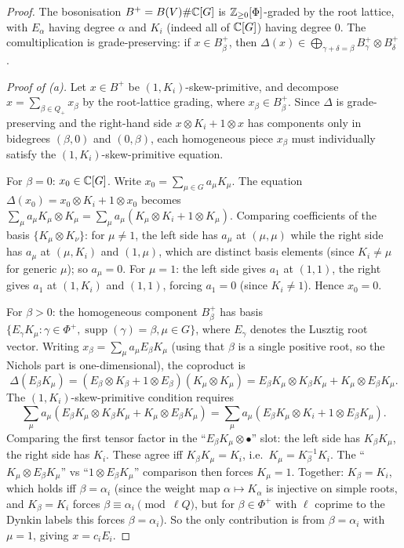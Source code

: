\begin{proof}
The bosonisation $B^+ = B(V) \# \mathbb{C}[G]$ is $\mathbb{Z}_{\geq 0}[\Phi]$-graded by the root lattice, with $E_\alpha$ having degree $\alpha$ and $K_i$ (indeed all of $\mathbb{C}[G]$) having degree $0$. The comultiplication is grade-preserving: if $x \in B^+_\beta$, then $\Delta(x) \in \bigoplus_{\gamma + \delta = \beta} B^+_\gamma \otimes B^+_\delta$.

\emph{Proof of (a).} Let $x \in B^+$ be $(1, K_i)$-skew-primitive, and decompose $x = \sum_{\beta \in Q_+} x_\beta$ by the root-lattice grading, where $x_\beta \in B^+_\beta$. Since $\Delta$ is grade-preserving and the right-hand side $x \otimes K_i + 1 \otimes x$ has components only in bidegrees $(\beta, 0)$ and $(0, \beta)$, each homogeneous piece $x_\beta$ must individually satisfy the $(1, K_i)$-skew-primitive equation.

For \emph{$\beta = 0$}: $x_0 \in \mathbb{C}[G]$. Write $x_0 = \sum_{\mu \in G} a_\mu K_\mu$. The equation $\Delta(x_0) = x_0 \otimes K_i + 1 \otimes x_0$ becomes $\sum_\mu a_\mu K_\mu \otimes K_\mu = \sum_\mu a_\mu (K_\mu \otimes K_i + 1 \otimes K_\mu)$. Comparing coefficients of the basis $\{K_\mu \otimes K_\nu\}$: for $\mu \neq 1$, the left side has $a_\mu$ at $(\mu, \mu)$ while the right side has $a_\mu$ at $(\mu, K_i)$ and $(1, \mu)$, which are distinct basis elements (since $K_i \neq \mu$ for generic $\mu$); so $a_\mu = 0$. For $\mu = 1$: the left side gives $a_1$ at $(1,1)$, the right gives $a_1$ at $(1, K_i)$ and $(1, 1)$, forcing $a_1 = 0$ (since $K_i \neq 1$). Hence $x_0 = 0$.

For \emph{$\beta > 0$}: the homogeneous component $B^+_\beta$ has basis $\{E_\gamma K_\mu : \gamma \in \Phi^+, \operatorname{supp}(\gamma) = \beta, \mu \in G\}$, where $E_\gamma$ denotes the Lusztig root vector. Writing $x_\beta = \sum_\mu a_\mu E_\beta K_\mu$ (using that $\beta$ is a single positive root, so the Nichols part is one-dimensional), the coproduct is
\[
\Delta(E_\beta K_\mu) = (E_\beta \otimes K_\beta + 1 \otimes E_\beta)(K_\mu \otimes K_\mu) = E_\beta K_\mu \otimes K_\beta K_\mu + K_\mu \otimes E_\beta K_\mu.
\]
The $(1, K_i)$-skew-primitive condition requires
\[
\sum_\mu a_\mu (E_\beta K_\mu \otimes K_\beta K_\mu + K_\mu \otimes E_\beta K_\mu) = \sum_\mu a_\mu (E_\beta K_\mu \otimes K_i + 1 \otimes E_\beta K_\mu).
\]
Comparing the first tensor factor in the ``$E_\beta K_\mu \otimes \bullet$'' slot: the left side has $K_\beta K_\mu$, the right side has $K_i$. These agree iff $K_\beta K_\mu = K_i$, i.e.\ $K_\mu = K_\beta^{-1} K_i$. The ``$K_\mu \otimes E_\beta K_\mu$'' vs ``$1 \otimes E_\beta K_\mu$'' comparison then forces $K_\mu = 1$. Together: $K_\beta = K_i$, which holds iff $\beta = \alpha_i$ (since the weight map $\alpha \mapsto K_\alpha$ is injective on simple roots, and $K_\beta = K_i$ forces $\beta \equiv \alpha_i \pmod{\ell Q}$, but for $\beta \in \Phi^+$ with $\ell$ coprime to the Dynkin labels this forces $\beta = \alpha_i$). So the only contribution is from $\beta = \alpha_i$ with $\mu = 1$, giving $x = c_i E_i$.


\end{proof}
